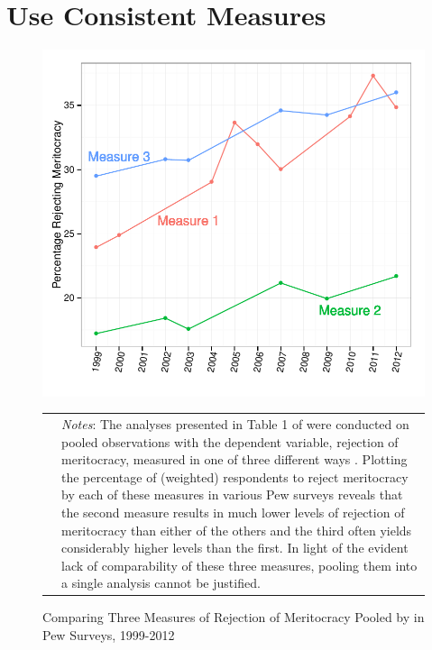 
\section{Use Consistent Measures}

\begin{figure}[htbp] 
  \caption{Comparing Three Measures of Rejection of Meritocracy Pooled by \citet{Newman2015} in Pew Surveys, 1999-2012}
  \label{F:three_measures}
  \begin{center}
    \includegraphics[width=5.25in]{../figures/04_three_measures_dv.pdf}
  \end{center}
  \begin{footnotesize}
  \begin{tabular}{p{.1in} p{5.1in}}
  & \emph{Notes}: The analyses presented in Table 1 of \citet[333]{Newman2015} were conducted on pooled observations with the dependent variable, rejection of meritocracy, measured in one of three different ways \citep[see][331]{Newman2015}.  Plotting the percentage of (weighted) respondents to reject meritocracy by each of these measures in various Pew surveys reveals that the second measure results in much lower levels of rejection of meritocracy than either of the others and the third often yields considerably higher levels than the first.  In light of the evident lack of comparability of these three measures, pooling them into a single analysis cannot be justified.
  \end{tabular}
  \end{footnotesize}
\end{figure}

